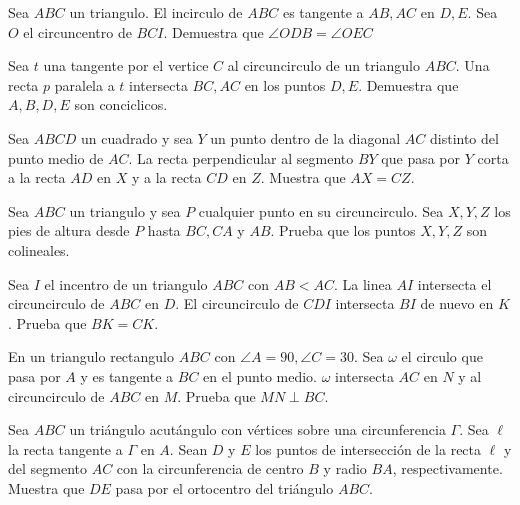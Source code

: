 \documentclass[11pt]{scrartcl}
\newcommand{\thmdifficulty}{0}
\newcommand{\problemdiff}[1]{\renewcommand{\thmdifficulty}{#1}}
\begin{document}
\problemdiff{3}
\begin{problem}
    Sea $ABC$ un triangulo. El incirculo de $ABC$ es tangente a $AB, AC$ en $D,E$. Sea $O$ el circuncentro de $BCI$. Demuestra que $\angle ODB=\angle OEC$
\end{problem}

\problemdiff{1}
\begin{problem}
    Sea $t$ una tangente por el vertice $C$ al circuncirculo de un triangulo $ABC$. Una recta $p$ paralela a $t$ intersecta $BC,AC$ en los puntos $D,E$. Demuestra que $A,B,D,E$ son conciclicos. 
\end{problem}



\problemdiff{2}
\begin{problem} 
    Sea $ABCD$ un cuadrado y sea $Y$ un punto dentro de la diagonal $AC$ distinto del punto medio de $AC$. La recta perpendicular al segmento $BY$ que pasa por $Y$ corta a la recta $AD$ en $X$ y a la recta $CD$ en $Z$. Muestra que $AX=CZ$. 
\end{problem}

\problemdiff{2}
\begin{problem}  
    Sea $ABC$ un triangulo y sea $P$ cualquier punto en su circuncirculo. Sea $X,Y,Z$ los pies de altura desde $P$ hasta $BC,CA$ y $AB$. Prueba que los puntos $X,Y,Z$ son colineales.
\end{problem}

\problemdiff{2}
\begin{problem}
    Sea $I$ el incentro de un triangulo $ABC$ con $AB<AC$. La linea $AI$ intersecta el circuncirculo de $ABC$ en $D$. El circuncirculo de $CDI$ intersecta $BI$ de nuevo en $K$. Prueba que $BK=CK$.
\end{problem}



\problemdiff{2.5}
\begin{problem}
    En un triangulo rectangulo $ABC$ con $\angle A=90, \angle C=30$. Sea $\omega$ el circulo que pasa por $A$ y es tangente a $BC$ en el punto medio. $\omega$ intersecta $AC$ en $N$ y al circuncirculo de $ABC$ en $M$. Prueba que $MN \perp BC$.
\end{problem}

\problemdiff{3}
\begin{problem} %
    Sea $ABC$ un triángulo acutángulo con vértices sobre una circunferencia $\Gamma$. Sea $\ell$ la recta
tangente a $\Gamma$ en $A$. Sean $D$ y $E$ los puntos de intersección de la recta $\ell$ y del segmento $AC$ con la circunferencia de centro $B$ y radio $BA$, respectivamente. Muestra que $DE$ pasa por el ortocentro del triángulo $ABC$.
    
\end{problem}
\end{document}
